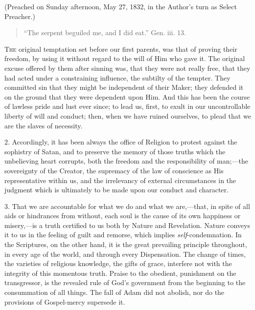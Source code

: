 (Preached on Sunday afternoon, May 27, 1832, in the Author's turn
as Select Preacher.)


\begin{quote}

``The serpent beguiled me, and I did eat.'' Gen. iii. 13.

\end{quote}

T\textsc{he} original temptation set before our first parents, was that of
proving their freedom, by using it without regard to the will of Him
who gave it. The original excuse offered by them after sinning was,
that they were not really free, that they had acted under a
constraining influence, the subtilty of the tempter. They committed
sin that they might be independent of their Maker; they defended it on
the ground that they were dependent upon Him. And this has been the
course of lawless pride and lust ever since; to lead us, first, to
exult in our uncontrollable liberty of will and conduct; then, when we
have ruined ourselves, to plead that we are the slaves of necessity.

2. Accordingly, it has been always the office of Religion to
protest against the sophistry of Satan, and to preserve the memory of
those truths which the unbelieving heart corrupts, both the freedom
and the responsibility of man;—the sovereignty of the Creator, the
supremacy of the law of conscience as His representative within us,
and the irrelevancy of external circumstances in the judgment which is
ultimately to be made upon our conduct and character.

3. That we are accountable for what we do and what we are,—that,
in spite of all aids or hindrances from without, each soul is the
cause of its own happiness or misery,—is a truth certified to us
both by Nature and Revelation. Nature conveys it to us in the feeling
of guilt and remorse, which implies \emph{self}-condemnation. In the
Scriptures, on the other hand, it is the great prevailing principle
throughout, in every age of the world, and through every Dispensation.
The change of times, the varieties of religious knowledge, the gifts
of grace, interfere not with the integrity of this momentous truth.
Praise to the obedient, punishment on the transgressor, is the
revealed rule of God's government from the beginning to the
consummation of all things. The fall of Adam did not abolish, nor do
the provisions of Gospel-mercy supersede it.

